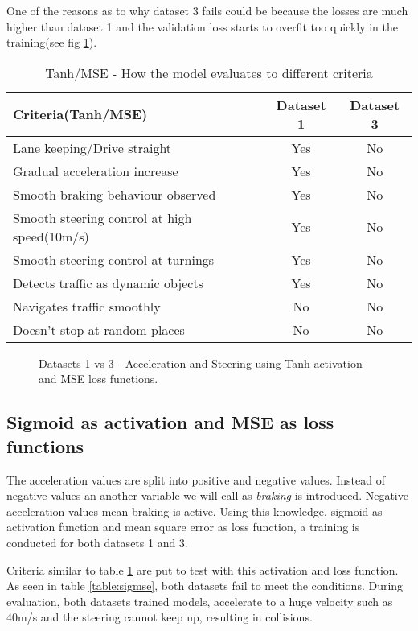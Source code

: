 One of the reasons as to why dataset 3 fails could be because the losses are much higher
than dataset 1 and the validation loss starts to overfit too quickly in the training(see
fig \ref{fig:ds1andd3tanhactivatonMSE}).
\begin{table}[h]
    \centering
\begin{tabular}{lcc}
    \toprule
    Criteria(Tanh/MSE) & Dataset 1 & Dataset 3 \\\midrule
    Lane keeping/Drive straight  & Yes & No  \\
    Gradual acceleration increase & Yes & No\\
    Smooth braking behaviour observed & Yes & No \\
    Smooth steering control at high speed(10m/s) & Yes & No \\
    Smooth steering control at turnings & Yes & No\\
    Detects traffic as dynamic objects & Yes & No\\
    Navigates traffic smoothly & No & No\\
    Doesn't stop at random places & No & No \\\bottomrule
\end{tabular}
\caption{Tanh/MSE - How the model evaluates to different criteria}
\label{table:tanhmse}
\end{table}
\begin{figure}[h]
	\centering
    \def\svgwidth{\textwidth}
    \caption{Datasets 1 vs 3 - Acceleration and Steering using Tanh activation and MSE loss
    functions.}
    \label{fig:ds1andd3tanhactivatonMSE}
\end{figure}

\subsection{Sigmoid as activation and MSE as loss functions}
The acceleration values are split into positive and negative values. Instead of negative
values an another variable we will call as \textit{braking} is introduced. Negative
acceleration values mean braking is active. Using this knowledge, sigmoid as activation function and mean
square error as loss function, a training is conducted for both datasets 1 and 3.

Criteria similar to table \ref{table:tanhmse} are put to test with this activation and
loss function. As seen in table \ref{table:sigmse}, both datasets fail to meet the
conditions. During evaluation, both datasets trained models, accelerate to a huge velocity
such as 40m/s and the steering cannot keep up, resulting in collisions.


